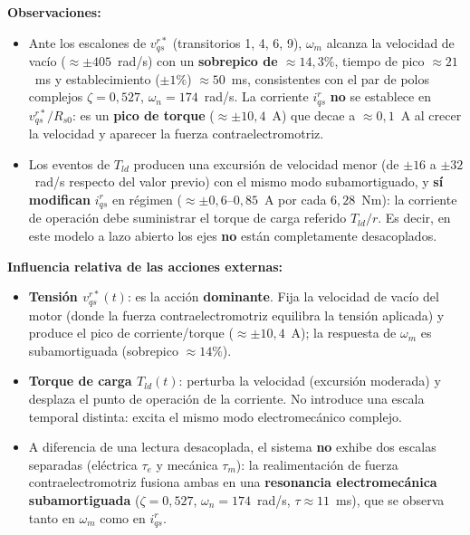 \documentclass[12pt, a4paper,journal, onecolumn, compsoc]{IEEEtran}
\begin{document}
\textbf{Observaciones:}
\begin{itemize}
    \item Ante los escalones de $v_{qs}^{r*}$ (transitorios 1, 4, 6, 9), $\omega_m$ alcanza la velocidad de vacío ($\approx \pm 405$~rad/s) con un \textbf{sobrepico de $\approx 14{,}3\%$}, tiempo de pico $\approx 21$~ms y establecimiento ($\pm 1\%$) $\approx 50$~ms, consistentes con el par de polos complejos $\zeta = 0{,}527$, $\omega_n = 174$~rad/s. La corriente $i_{qs}^r$ \textbf{no} se establece en $v_{qs}^{r*}/R_{s0}$: es un \textbf{pico de torque} ($\approx \pm 10{,}4$~A) que decae a $\approx 0{,}1$~A al crecer la velocidad y aparecer la fuerza contraelectromotriz.

    \item Los eventos de $T_{ld}$ producen una excursión de velocidad menor (de $\pm 16$ a $\pm 32$~rad/s respecto del valor previo) con el mismo modo subamortiguado, y \textbf{sí modifican} $i_{qs}^r$ en régimen ($\approx \pm 0{,}6$--$0{,}85$~A por cada $6{,}28$~Nm): la corriente de operación debe suministrar el torque de carga referido $T_{ld}/r$. Es decir, en este modelo a lazo abierto los ejes \textbf{no} están completamente desacoplados.
\end{itemize}

\textbf{Influencia relativa de las acciones externas:}

\begin{itemize}
    \item \textbf{Tensión $v_{qs}^{r*}(t)$}: es la acción \textbf{dominante}. Fija la velocidad de vacío del motor (donde la fuerza contraelectromotriz equilibra la tensión aplicada) y produce el pico de corriente/torque ($\approx \pm 10{,}4$~A); la respuesta de $\omega_m$ es subamortiguada (sobrepico $\approx 14\%$).

    \item \textbf{Torque de carga $T_{ld}(t)$}: perturba la velocidad (excursión moderada) y desplaza el punto de operación de la corriente. No introduce una escala temporal distinta: excita el mismo modo electromecánico complejo.

    \item A diferencia de una lectura desacoplada, el sistema \textbf{no} exhibe dos escalas separadas (eléctrica $\tau_e$ y mecánica $\tau_m$): la realimentación de fuerza contraelectromotriz fusiona ambas en una \textbf{resonancia electromecánica subamortiguada} ($\zeta = 0{,}527$, $\omega_n = 174$~rad/s, $\tau \approx 11$~ms), que se observa tanto en $\omega_m$ como en $i_{qs}^r$.
\end{itemize}
\end{document}
